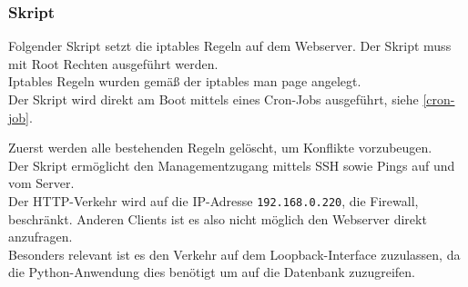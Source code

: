 \documentclass[
    a4paper,
    pagesize,
	pdftex,
    12pt,
]{scrartcl}
\begin{document}
\subsubsection{Skript}
Folgender  Skript setzt die iptables Regeln auf dem Webserver. Der  Skript muss mit Root Rechten ausgeführt  werden. \\
Iptables Regeln wurden gemäß der iptables man page \cite{iptables-manpage} angelegt. \\
Der Skript wird direkt am Boot mittels eines Cron-Jobs ausgeführt, siehe  \ref{cron-job}.

Zuerst werden  alle bestehenden Regeln gelöscht, um Konflikte vorzubeugen. \\
Der Skript ermöglicht den Managementzugang mittels SSH sowie Pings auf und vom  Server. \\
Der HTTP-Verkehr wird auf die IP-Adresse \lstinline[breaklines]|192.168.0.220|, die Firewall, beschränkt. Anderen Clients ist es also nicht möglich den Webserver direkt anzufragen. \\
Besonders relevant ist es den Verkehr auf dem Loopback-Interface zuzulassen, da die Python-Anwendung dies benötigt um auf die Datenbank zuzugreifen.

\newpage
\end{document}
